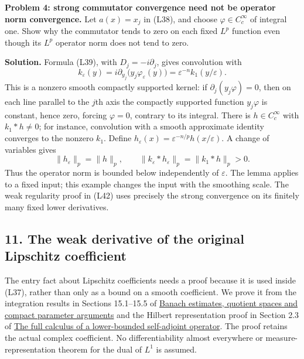 \documentclass[
  11pt,
]{article}
\makeatletter
\let\ReaderOriginalAnchorStart\hyper@anchorstart
\let\ReaderOriginalAnchorEnd\hyper@anchorend
\let\ReaderPendingAliases\@empty
\def\ReaderArmAliases#1{\gdef\ReaderPendingAliases{#1}}
\def\hyper@anchorstart#1{\ReaderIfNativeAnchorTF{#1}{\ReaderPendingAliases\global\let\ReaderPendingAliases\@empty}{}\ReaderOriginalAnchorStart{#1}}
\makeatother
\begin{document}
\textbf{Problem 4: strong commutator convergence need not be operator
norm convergence.} Let \(a(x)=x_j\) in (L38), and choose
\(\varphi\in C_c^\infty\) of integral one. Show why the commutator tends
to zero on each fixed \(L^p\) function even though its \(L^p\) operator
norm does not tend to zero.

\textbf{Solution.} Formula (L39), with \(D_j=-i\partial_j\), gives
convolution with \[
k_\varepsilon(y)=i\partial_{y_j}\bigl(y_j\varphi_\varepsilon(y)\bigr)
=\varepsilon^{-n}k_1(y/\varepsilon).
\] This is a nonzero smooth compactly supported kernel: if
\(\partial_j(y_j\varphi)=0\), then on each line parallel to the \(j\)th
axis the compactly supported function \(y_j\varphi\) is constant, hence
zero, forcing \(\varphi=0\), contrary to its integral. There is
\(h\in C_c^\infty\) with \(k_1*h\ne0\); for instance, convolution with a
smooth approximate identity converges to the nonzero \(k_1\). Define
\(h_\varepsilon(x)=\varepsilon^{-n/p}h(x/\varepsilon)\). A change of
variables gives \[
\|h_\varepsilon\|_p=\|h\|_p,\qquad
\|k_\varepsilon*h_\varepsilon\|_p=\|k_1*h\|_p>0.
\] Thus the operator norm is bounded below independently of
\(\varepsilon\). The lemma applies to a fixed input; this example
changes the input with the smoothing scale. The weak regularity proof in
(L42) uses precisely the strong convergence on its finitely many fixed
lower derivatives.

\ReaderArmAliases{\ReaderOriginalAnchorStart{the-weak-derivative-of-the-original-lipschitz-coefficient}\ReaderOriginalAnchorEnd}
\subsection{11. The weak derivative of the original Lipschitz
coefficient}\label{the-weak-derivative-of-the-original-lipschitz-coefficient}

The entry fact about Lipschitz coefficients needs a proof because it is
used inside (L37), rather than only as a bound on a smooth coefficient.
We prove it from the integration results in Sections 15.1--15.5 of
\href{banach-foundation-bridges.pdf}{Banach estimates, quotient spaces
and compact parameter arguments} and the Hilbert representation proof in
Section 2.3 of \href{lower-bounded-spectral-calculus.pdf}{The full
calculus of a lower-bounded self-adjoint operator}. The proof retains
the actual complex coefficient. No differentiability almost everywhere
or measure-representation theorem for the dual of \(L^1\) is assumed.

\ReaderArmAliases{\ReaderOriginalAnchorStart{AN03-LCE-LIP-001}\ReaderOriginalAnchorEnd\begingroup\expandafter\def\csname @currentHref\endcsname{AN03-LCE-LIP-001}\label{AN03-LCE-LIP-001}\endgroup\ReaderOriginalAnchorStart{difference-quotients-and-a-bounded-measurable-derivative}\ReaderOriginalAnchorEnd}
\end{document}
